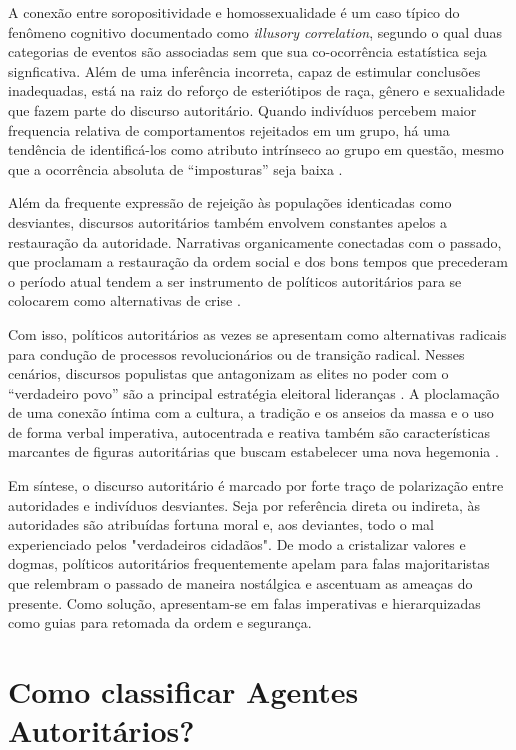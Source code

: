 \documentclass[
12pt,				%
openright,			%
twoside,			%
a4paper,			%
english,			%
french,				%
spanish,			%
brazil				%
]{abntex2}
\begin{document}
A conexão entre soropositividade e homossexualidade é um caso típico do fenômeno cognitivo documentado como \emph{illusory correlation}, segundo o qual duas categorias de eventos são associadas sem que sua co-ocorrência estatística seja signficativa. Além de uma inferência incorreta, capaz de estimular conclusões inadequadas, está na raiz do reforço de esteriótipos de raça, gênero e sexualidade que fazem parte do discurso autoritário. Quando indivíduos percebem maior frequencia relativa de comportamentos rejeitados em um grupo, há uma tendência de identificá-los como atributo intrínseco ao grupo em questão, mesmo que a ocorrência absoluta de ``imposturas'' seja baixa \cite{sidanius2001social}.   

Além da frequente expressão de rejeição às populações identicadas como desviantes, discursos autoritários também envolvem constantes apelos a restauração da autoridade. Narrativas organicamente conectadas com o passado, que proclamam a restauração da ordem social e dos bons tempos que precederam o período atual tendem a ser instrumento de políticos autoritários para se colocarem como alternativas de crise \cite{pinto2004indoctrinating, mietzner2014indonesia}. 

Com isso, políticos autoritários as vezes se apresentam como alternativas radicais para condução de processos revolucionários ou de transição radical. Nesses cenários, discursos populistas que antagonizam as elites no poder com o ``verdadeiro povo'' são a principal estratégia eleitoral lideranças \cite{muller2017populism, levitsky2018democracies}. A ploclamação de uma conexão íntima com a cultura, a tradição e os anseios da massa e o uso de forma verbal imperativa, autocentrada e reativa também são características marcantes de figuras autoritárias que buscam estabelecer uma nova hegemonia \cite{goldschlager1982towards, gounari2018authoritarianism, hunter2019bolsonaro}.

Em síntese, o discurso autoritário é marcado por forte traço de polarização entre autoridades e indivíduos desviantes. Seja por referência direta ou indireta, às autoridades são atribuídas fortuna moral e, aos deviantes, todo o mal experienciado pelos "verdadeiros cidadãos". De modo a cristalizar valores e dogmas, políticos autoritários frequentemente apelam para falas majoritaristas que relembram o passado de maneira nostálgica e ascentuam as ameaças do presente. Como solução, apresentam-se em falas imperativas e hierarquizadas como guias para retomada da ordem e segurança. 


\chapter{Como classificar Agentes Autoritários?}\label{metodologia}
\end{document}
